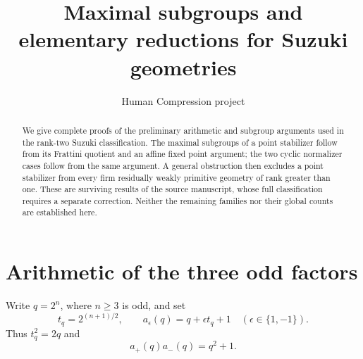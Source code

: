 \documentclass[11pt,a4paper]{article}
\title{Maximal subgroups and elementary reductions for Suzuki geometries}
\author{Human Compression project}\date{}
\begin{document}
\maketitle
\begin{abstract}
We give complete proofs of the preliminary arithmetic and subgroup
arguments used in the rank-two Suzuki classification. The maximal
subgroups of a point stabilizer follow from its Frattini quotient and
an affine fixed point argument; the two cyclic normalizer cases follow
from the same argument. A general obstruction then excludes a point
stabilizer from every firm residually weakly primitive geometry of rank
greater than one. These are surviving results of the source manuscript,
whose full classification requires a separate correction. Neither the
remaining families nor their global counts are established here.
\end{abstract}

\section{Arithmetic of the three odd factors}
Write $q=2^n$, where $n\ge3$ is odd, and set
\[
 t_q=2^{(n+1)/2},\qquad a_\epsilon(q)=q+\epsilon t_q+1
 \quad(\epsilon\in\{1,-1\}).
\]
Thus $t_q^2=2q$ and
\begin{equation}\label{factor}
             a_+(q)a_-(q)=q^2+1.
\end{equation}
\end{document}
